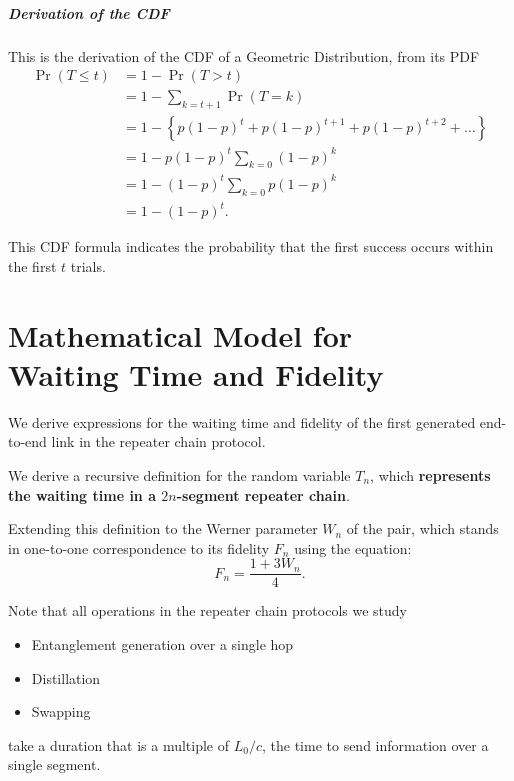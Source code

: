 \documentclass{masterthesis}
\begin{document}
\paragraph*{Derivation of the CDF}

This is the derivation of the CDF of a Geometric Distribution, from its PDF
\begin{align*}
    \Pr(T \leq t) &= 1 - \Pr(T > t) \\
    &= 1 - \sum_{k=t+1} \Pr(T = k) \\
    &= 1 - \left\{p (1 - p)^t + p (1 - p)^{t+1} + p (1 - p)^{t+2} + \ldots\right\} \\
    &= 1 - p (1 - p)^t \sum_{k=0} (1 - p)^k \\
    &= 1 - (1 - p)^t \sum_{k=0} p (1 - p)^k \\
    &= 1 - (1 - p)^t.
\end{align*} %

This CDF formula indicates the probability that the first success occurs within the first \( t \) trials.

\chapter*{Mathematical Model for \\ Waiting Time and Fidelity}

We derive expressions for the waiting time and fidelity of the first generated end-to-end link in the repeater chain protocol. 

We derive a recursive definition for the random variable $T_n$, which \textbf{represents the waiting time in a $2n$-segment repeater chain}.

Extending this definition to the Werner parameter $W_n$ of the pair, which stands in one-to-one correspondence to its fidelity $F_n$ using the equation:
\begin{equation}
    F_n = \frac{1 + 3 W_n}{4}.
\end{equation}

Note that all operations in the repeater chain protocols we study
\begin{itemize}
    \item Entanglement generation over a single hop
    \item Distillation
    \item Swapping
\end{itemize}
take a duration that is a multiple of ${L_0}/{c}$, the time to send information over a single segment.
\end{document}
